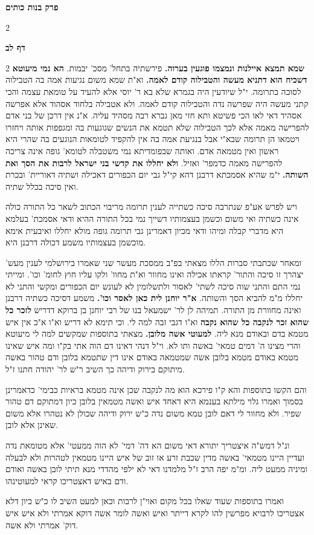 \documentclass[12pt, openany]{book}
\newcommand{\sethebfont}{
\fontsize{10.5pt}{21.0pt} \selectfont
}
\newcommand{\twocol}[1]{
	{\sethebfont \begin{multicols}{2}
			#1
	\end{multicols}}	
}
\newcommand{\chapname}{}
\newcommand{\sectname}{}
\newcommand{\newchap}[1]{
	\addcontentsline{toc}{chapter}{#1}
	\renewcommand{\chapname}{#1}
		\begin{center}
			\textbf{%
\fontsize{16pt}{16pt}\selectfont
				#1}
		\end{center}
}
\newcommand{\newsection}[1]{
	\renewcommand{\sectname}{#1}	
	\vspace{-\baselineskip}
	\begin{center}
		\textbf{%
\fontsize{16pt}{16pt}\selectfont
			#1}
	\end{center}
	\vspace{-\baselineskip}
	\nopagebreak
}
\begin{document}
{\newchap{פרק  בנות כותים}
\twocol{\clearpage}

\newsection{דף לב}
\twocol{\textbf{שמא תמצא איילנות ונמצמו פוגעין בערוה.} פירשתיה בתחל' מסכ' יבמות.
\textbf{הא נמי מיעוטא דשכיח הוא דתניא מעשה והטבילוה קודם לאמה.} וא"ת שמא משום נגיעות אמה בה הטבילוה לסוכה בתרומה. י"ל שיודעין היה בגמרא שלא בא ר' יוסי אלא להעיד על טומאת עצמה והכי קתני מעשה היה שפרשה נדה והטבילוה קודם לאמה. ולא אטבילה בלחוד אסהוד אלא אפרשה אסהיד דאי לאו הכי פשיטא ותא חזי מאן גברא רבה מסהיד עליה. א"נ אין דרכן של בני אדם להפרישה מאמה אלא לכך הטבילוה שלא תטמא את הנשים שגוגעות בה ומגפפות אותה ויחזרו ויטמאו הן תרומה שבא"י אבל בנגיעת אמה בה אין להקפיד לטומאות הנוגעים בה שהרי היא ראשון ואין מטמאה אדם. ואותה שבפומדיתא נמי משטבלה לטומא' גופה אינה צריכה להפרישה מאמה כדמפר' ואזיל. 
\textbf{ולא יחללו את קדשי בני ישראל לרבות את הסך ואת השותה.} י"מ שהיא אסמכתא דרבנן דהא קי"ל גבי יום הכפורים דאכילה ושתיה דאוריית' ובכרת ואין סיכה בכלל שתיה.\par ויש לפרש אע"פ שנתרבה סיכה כשתייה לענין תרומה מריבוי הכתוב לשאר כל התורה כולה אינה כשתיה ואי משום וכשמן בעצמותיו דשייך נמי בכל התורה ההיא ודאי אסמכת' בעלמא היא מדברי קבלה ומיהו ודאי מכיון דאמרינן גבי תרומה גופה מולא יחללו ואיבעית אימא מוכשמן בעצמותיו משמע דכולה דרבנן היא.\par ומאחר שכתבתי סברות הללו מצאתי בפ"ב ממסכת מעשר שני שאמרו בירושלמי לענין מעש' יצהרך זו סיכה והתור' קראתו אכילה ואינו מחוור וא"ת מחוו' ולקו עליו חוץ לחומ' וכו'. ומייתי נמי התם והתני שוה סיכה לשתי' לאסור ולתשלומין לא לעונש יום הכפורים ומקשי והתני לא יחללו מ"מ להביא הסך והשותה. 
\textbf{א"ר יוחנן לית כאן לאסר וכו'.} משמע דסיכה כשתיה דרבנן ואינה מחוורת מן התורה. 
תמיהה לן לר' ישמעאל בנו של רבי יוחנן בן ברוקא דדריש \textbf{לזכר כל שהוא זכר לנקבה כל שהוא נקבה} וא"ו דגבי זבה למה לי. וכי תימא לא דריש וא"ו א"כ אין איש מטמא בדם ובאודם מנא ליה. 
\textbf{למעוטי אשה מלובן.} מצאתי בתוספות שמקשים למה לי מיעוטא והרי מצינו ה' דמים טמאי' באשה ותו לא. וי"ל דנהי דאינו דם הוה אתי בק"ו ומה איש שאינו מטמא באודם מטמא בלובן אשה שמטמאה באודם אינו דין שתטמא בלובן ודם טהור באשה מיתוקם בירוק ודיהה כך השיב ר"ש לר' יהודה חתנו ז"ל.\par והם הקשו בתוספות והא ק"ו פירכא הוא מה לנקבה שכן אינה מטמא בראיות כבימי' כדאמרינן בסמוך ואמרו גלוי מילתא בענמא היא דאחד איש ואשה מטמאין בלובן כיון דמתוקם דם טהור שפיר. ולא מחוור לי דאם לובן טמא משום נדה כ"ש ירוק ודיהה שכולן לא נטהרו אלא משום שאינן אלא לובן.\par ונ"ל דמש"ה איצטריך יתורא דאי משום הא דה' דמי' לא הוה ממעטי' אלא מטומאת נדה ועדיין היינו מטמאי' באשה מדין שכבת זרע או זוב של איש היינו מטמאין לטהרות ולא לבעלה ומיניה ממעט ליה. ומ"מ יפה הרב ז"ל מלמדנו דאי לא ילפי מהדדי מנא תיתי לובן באשה ואודם ודם באיש דאצטריכו קראי למעוטינהו.\par ואמרו בתוספות שעוד שאלו בכל מקום ואוי"ן לרבות וכאן למעט השיב לו כ"ש כיון דלא אצטריכו לרבויא מפרשין להו לקרא דייתר ואיש ואשה לומר אשה דוקא אמרתי ולא איש איש דוק' אמרתי ולא אשה. 
}}
\end{document}

